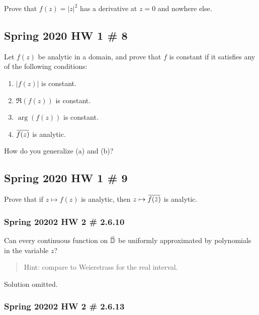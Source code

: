 Prove that \(f(z) = {\left\lvert {z} \right\rvert}^2\) has a derivative
at \(z=0\) and nowhere else.

\hypertarget{spring-2020-hw-1-8}{%
\subsection{Spring 2020 HW 1 \# 8}\label{spring-2020-hw-1-8}}

Let \(f(z)\) be analytic in a domain, and prove that \(f\) is constant
if it satisfies any of the following conditions:

\begin{enumerate}
\def\labelenumi{\alph{enumi}.}
\tightlist
\item
  \({\left\lvert {f(z)} \right\rvert}\) is constant.
\item
  \(\Re(f(z))\) is constant.
\item
  \(\arg(f(z))\) is constant.
\item
  \(\mkern 1.5mu\overline{\mkern-1.5muf(z)\mkern-1.5mu}\mkern 1.5mu\) is
  analytic.
\end{enumerate}

How do you generalize (a) and (b)?

\hypertarget{spring-2020-hw-1-9}{%
\subsection{Spring 2020 HW 1 \# 9}\label{spring-2020-hw-1-9}}

Prove that if \(z\mapsto f(z)\) is analytic, then
\(z \mapsto \mkern 1.5mu\overline{\mkern-1.5muf(\mkern 1.5mu\overline{\mkern-1.5muz\mkern-1.5mu}\mkern 1.5mu)\mkern-1.5mu}\mkern 1.5mu\)
is analytic.

\hypertarget{spring-20202-hw-2-2.6.10}{%
\subsubsection{Spring 20202 HW 2 \#
2.6.10}\label{spring-20202-hw-2-2.6.10}}

Can every continuous function on
\(\mkern 1.5mu\overline{\mkern-1.5mu{\mathbb{D}}\mkern-1.5mu}\mkern 1.5mu\)
be uniformly approximated by polynomials in the variable \(z\)?

\begin{quote}
Hint: compare to Weierstrass for the real interval.
\end{quote}

Solution omitted.

\hypertarget{spring-20202-hw-2-2.6.13}{%
\subsubsection{Spring 20202 HW 2 \#
2.6.13}\label{spring-20202-hw-2-2.6.13}}

